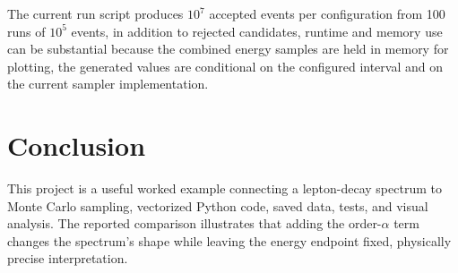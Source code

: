 \documentclass[conference]{IEEEtran}
\begin{document}
The current run script produces $10^7$ accepted events per configuration from 100 runs of $10^5$ events, in addition to rejected candidates, runtime and memory use can be substantial because the combined energy samples are held in memory for plotting, the generated values are conditional on the configured interval and on the current sampler implementation.

\section{Conclusion}

This project is a useful worked example connecting a lepton-decay spectrum to Monte Carlo sampling, vectorized Python code, saved data, tests, and visual analysis. The reported comparison illustrates that adding the order-$\alpha$ term changes the spectrum's shape while leaving the energy endpoint fixed, physically precise interpretation.



\end{document}
